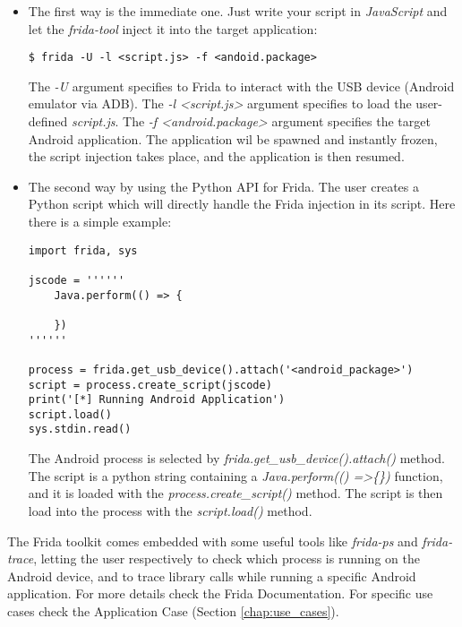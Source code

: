 			\begin{itemize}
				\item The first way is the immediate one. Just write your script in \textit{JavaScript} and let the \textit{frida-tool} inject it into the target application:
\begin{lstlisting}
$ frida -U -l <script.js> -f <andoid.package>
\end{lstlisting}
				The \textit{-U} argument specifies to Frida to interact with the USB device (Android emulator via ADB).\newline
				The \textit{-l <script.js>} argument specifies to load the user-defined \textit{script.js}.\newline
				The \textit{-f <android.package>} argument specifies the target Android application. The application wil be spawned and instantly frozen, the script injection takes place, and the application is then resumed.  
				\item The second way by using the Python API for Frida. The user creates a Python script which will directly handle the Frida injection in its script. Here there is a simple example:
\begin{lstlisting}
import frida, sys

jscode = ''''''
	Java.perform(() => {
	
	})
''''''

process = frida.get_usb_device().attach('<android_package>')
script = process.create_script(jscode)
print('[*] Running Android Application')
script.load()
sys.stdin.read()
\end{lstlisting}
			The Android process is selected by \textit{frida.get\_usb\_device().attach()} method.
			The script is a python string containing a \textit{Java.perform(() =>\{\})} function, and it is loaded with the \textit{process.create\_script()} method.
			The script is then load into the process with the \textit{script.load()} method.
			\end{itemize}
			\par The Frida toolkit comes embedded with some useful tools like \textit{frida-ps} and \textit{frida-trace}, letting the user respectively to check which process is running on the Android device, and to trace library calls while running a specific Android application. For more details check the Frida Documentation\cite{frida}. \newline
			For specific use cases check the Application Case (Section \ref{chap:use_cases}).

